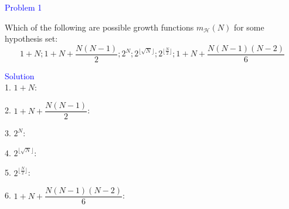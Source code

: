 \textcolor{blue}{Problem 1}

Which of the following are possible growth functions $m_{\mathcal{H}}(N)$ for some hypothesis set:
$$
1+N ; 1+N+\dfrac{N(N-1)}{2} ; 2^N ; 2^{\lfloor\sqrt{N}\rfloor} ; 2^{\lfloor \frac{N}{2} \rfloor} ; 1+N+\dfrac{N(N-1)(N-2)}{6}
$$

\textcolor{blue}{Solution}\\
1. $1+N$:





2. $1+N+\dfrac{N(N-1)}{2}$:




3. $2^N$:




4. $2^{\lfloor\sqrt{N}\rfloor}$:





5. $2^{\lfloor \frac{N}{2} \rfloor}$:





6. $1+N+\dfrac{N(N-1)(N-2)}{6}$:












\newpage